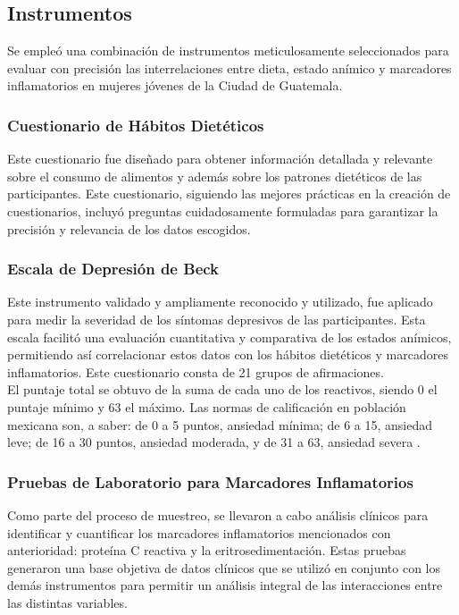 \documentclass[jou]{apa7}
\begin{document}
	\subsection{Instrumentos}\label{instrumentos}

	Se empleó una combinación de instrumentos
	meticulosamente seleccionados para evaluar con precisión las
	interrelaciones entre dieta, estado anímico y marcadores inflamatorios
	en mujeres jóvenes de la Ciudad de Guatemala.\\

	\subsubsection{Cuestionario de Hábitos Dietéticos}
	Este cuestionario fue diseñado para obtener información detallada y relevante sobre el consumo de alimentos y además sobre los patrones dietéticos de las participantes. Este cuestionario, siguiendo las mejores prácticas en la creación de cuestionarios, incluyó preguntas cuidadosamente formuladas para garantizar la precisión y relevancia de los datos escogidos.\\

	\subsubsection{Escala de Depresión de Beck}
	Este instrumento validado y ampliamente reconocido y utilizado, fue aplicado para medir la severidad de los síntomas depresivos de las participantes. Esta escala facilitó una evaluación cuantitativa y comparativa de los estados anímicos, permitiendo así correlacionar estos datos con los hábitos dietéticos y marcadores inflamatorios. Este cuestionario consta de 21 grupos de afirmaciones.\\

	El puntaje total se obtuvo de la suma de cada uno de los reactivos, siendo 0 el puntaje mínimo y 63 el máximo. Las normas de calificación en población mexicana son, a saber: de 0 a 5 puntos, ansiedad mínima; de 6 a 15, ansiedad leve; de 16 a 30 puntos, ansiedad moderada, y de 31 a 63, ansiedad severa \parencite{beckDepressionCausesTreatment2009}.\\

	\subsubsection{Pruebas de Laboratorio para Marcadores Inflamatorios}
	Como parte del proceso de muestreo, se llevaron a cabo análisis clínicos para identificar y cuantificar los marcadores inflamatorios mencionados con anterioridad: proteína C reactiva y la eritrosedimentación. Estas pruebas generaron una base objetiva de datos clínicos que se utilizó en conjunto con los demás instrumentos para permitir un análisis integral de las interacciones entre las distintas variables.
\end{document}

